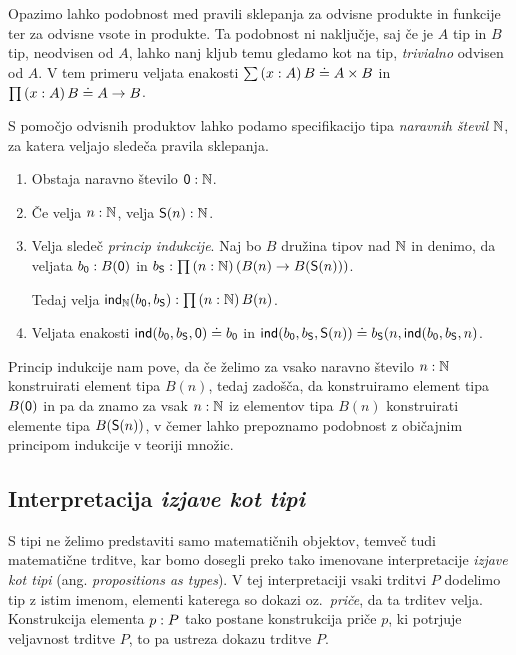 \begin{opomba}
  \label{neodvisna-vsota}
Opazimo lahko podobnost med pravili sklepanja za odvisne produkte in
funkcije ter za odvisne vsote in produkte. Ta podobnost ni naključje, saj če
je \(A\) tip in \(B\) tip, neodvisen od \(A\), lahko nanj kljub temu gledamo kot na tip,
\emph{trivialno} odvisen od \(A\). V tem primeru veljata enakosti
\(\sum \left( x : A \right) B \doteq A \times B\) in \(\prod \left( x : A \right) B \doteq A \to B\).
\end{opomba}

\begin{primer}
  S pomočjo odvisnih produktov lahko podamo specifikacijo tipa
  \emph{naravnih števil} \(\mathbb N\), za katera veljajo sledeča pravila sklepanja.
  \begin{enumerate}
  \item Obstaja naravno število \(\textnormal{\textsf{0}} : \mathbb N\).
  \item Če velja \(n : \mathbb N\),
    velja \(\textnormal{\textsf{S}}(n) : \mathbb N\).
  \item Velja sledeč \emph{princip indukcije}. Naj bo \(B\) družina tipov nad \(\mathbb N\) in
    denimo, da veljata \(b_{\textnormal{\textsf{0}}} : B(\textnormal{\textsf{0}})\) in
    \(b_{\textnormal{\textsf{S}}} : \prod \left( n : \mathbb N \right) (B(n) \to B(\textnormal{\textsf{S}}(n)))\).

    Tedaj velja
    \(\textnormal{\textsf{ind}}_{\mathbb N}(b_{\textnormal{\textsf{0}}}, b_{\textnormal{\textsf{S}}}) : \prod \left( n : \mathbb N \right) B(n)\).
  \item Veljata enakosti
    \label{naturals}
    \(\textnormal{\textsf{ind}}(b_{\textnormal{\textsf{0}}}, b_{\textnormal{\textsf{S}}}, \textnormal{\textsf{0}}) \doteq b_{\textnormal{\textsf{0}}}\) in
    \(\textnormal{\textsf{ind}}(b_{\textnormal{\textsf{0}}}, b_{\textnormal{\textsf{S}}}, \textnormal{\textsf{S}}(n)) \doteq
      b_{\textnormal{\textsf{S}}}(n, \textnormal{\textsf{ind}}(b_{\textnormal{\textsf{0}}}, b_{\textnormal{\textsf{S}}}, n)\).
  \end{enumerate}
  Princip indukcije nam pove, da če želimo za vsako naravno število \(n : \mathbb N\)
  konstruirati element tipa \(B(n)\), tedaj zadošča, da konstruiramo element tipa \(B(\textnormal{\textsf{0}})\)
  in pa da znamo za vsak \(n : \mathbb N\) iz elementov tipa \(B(n)\) konstruirati elemente
  tipa \(B(\textnormal{\textsf{S}}(n))\), v čemer lahko prepoznamo podobnost z običajnim principom indukcije v
  teoriji množic.
\end{primer}

\subsection{Interpretacija \emph{izjave kot tipi}}

S tipi ne želimo predstaviti samo matematičnih objektov, temveč tudi matematične trditve,
kar bomo dosegli preko tako imenovane interpretacije \emph{izjave kot tipi}
(ang. \emph{propositions as types}). V tej interpretaciji vsaki trditvi \(P\) dodelimo
tip z istim imenom, elementi katerega so dokazi oz.~\emph{priče}, da ta trditev velja.
Konstrukcija
elementa \(p : P\) tako postane konstrukcija priče \(p\), ki potrjuje
veljavnost trditve \(P\), to pa ustreza dokazu trditve \(P\).

